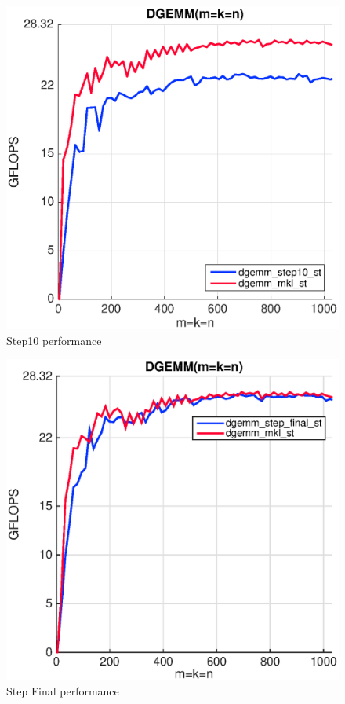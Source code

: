 \begin{figure}[!htp]
  \centering
  \includegraphics[scale=.5]{figures/step10_single_thread_ivy.eps}
  \caption{Step10 performance}
  \label{fig:int}
\end{figure} 

\begin{figure}[!htp]
  \centering
  \includegraphics[scale=.5]{figures/step_final_single_thread_ivy.eps}
  \caption{Step Final performance}
  \label{fig:final}
\end{figure} 

